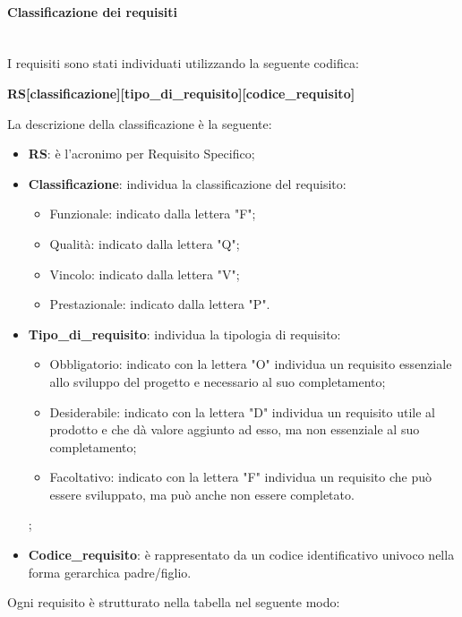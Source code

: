 \paragraph{Classificazione dei requisiti}\label{2.2.3.1.5}\mbox{}\\%
I requisiti sono stati individuati utilizzando la seguente codifica:
\begin{center}
	\textbf{RS[classificazione][tipo\_di\_requisito][codice\_requisito]}
\end{center} 
La descrizione della classificazione è la seguente:
\begin{itemize}
	\item \textbf{RS}: è l'acronimo per Requisito Specifico;
	\item \textbf{Classificazione}: individua la classificazione del requisito:
	\begin{itemize}
		\item Funzionale: indicato dalla lettera "F";
		\item Qualità: indicato dalla lettera "Q";
		\item Vincolo: indicato dalla lettera "V";
		\item Prestazionale: indicato dalla lettera "P".
	\end{itemize}
	\item \textbf{Tipo\_di\_requisito}: individua la tipologia di requisito:
	\begin{itemize}
		\item Obbligatorio: indicato con la lettera "O" individua un requisito essenziale allo sviluppo del progetto e necessario al suo completamento;
		\item Desiderabile: indicato con la lettera "D" individua un requisito utile al prodotto e che dà valore aggiunto ad esso, ma non essenziale al suo completamento;
		\item Facoltativo: indicato con la lettera "F" individua un requisito che può essere sviluppato, ma può anche non essere completato.
	\end{itemize};
	\item \textbf{Codice\_requisito}: è rappresentato da un codice identificativo univoco nella forma gerarchica padre/figlio.
\end{itemize}
Ogni requisito è strutturato nella tabella nel seguente modo:
